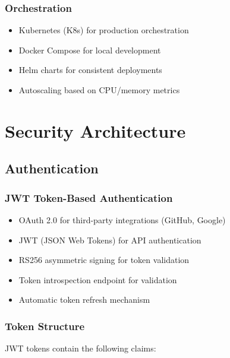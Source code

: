 \documentclass[12pt,a4paper]{report}
\begin{document}
\subsection{Orchestration}

\begin{itemize}[label=\textbullet]
    \item Kubernetes (K8s) for production orchestration
    \item Docker Compose for local development
    \item Helm charts for consistent deployments
    \item Autoscaling based on CPU/memory metrics
\end{itemize}

\newpage

\chapter{Security Architecture}

\section{Authentication}

\subsection{JWT Token-Based Authentication}

\begin{itemize}[label=\textbullet]
    \item OAuth 2.0 for third-party integrations (GitHub, Google)
    \item JWT (JSON Web Tokens) for API authentication
    \item RS256 asymmetric signing for token validation
    \item Token introspection endpoint for validation
    \item Automatic token refresh mechanism
\end{itemize}

\subsection{Token Structure}

JWT tokens contain the following claims:
\end{document}
